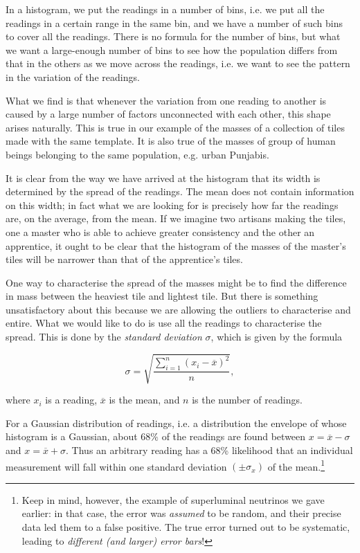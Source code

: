 In a histogram, we put the readings in a number of bins, i.e. we put all the readings in a certain range in the same bin, and we have a number of such bins to cover all the readings. There is no formula for the number of bins, but what we want a large-enough number of bins to see how the population differs from that in the others as we move across the readings, i.e. we want to see the pattern in the variation of the readings. 

What we find is that whenever the variation from one reading to another is caused by a large number of factors unconnected with each other, this shape arises naturally. This is true in our example of the masses of a collection of tiles made with the same template. It is also true of the masses of group of human beings belonging to the same population, e.g. urban Punjabis. 

It is clear from the way we have arrived at the histogram that its width is determined by the spread of the readings. The mean does not contain information on this width; in fact what we are looking for is precisely how far the readings are, on the average, from the mean. If we imagine two artisans making the tiles, one a master who is able to achieve greater consistency and the other an apprentice, it ought to be clear that the histogram of the masses of the master's tiles will be narrower than that of the apprentice's tiles.

One way to characterise the spread of the masses might be to find the difference in mass between the heaviest tile and lightest tile. But there is something unsatisfactory about this because we are allowing the outliers to characterise and entire. What we would like to do is use all the readings to characterise the spread. This is done by the \textit{standard deviation} $\sigma$, which is given by the formula

\begin{equation}
    \sigma = \sqrt{\frac{\sum_{i=1}^{n} (x_i - \overline{x})^2}{n}},
\end{equation}

where $x_i$ is a reading, $\overline{x}$ is the mean, and $n$ is the number of readings.

For a Gaussian distribution of readings, i.e. a distribution the envelope of whose histogram is a Gaussian, about $68 \%$ of the readings are found between $x = \overline{x} - \sigma$ and $x = \overline{x} + \sigma$. Thus an arbitrary reading has a 68\% likelihood that an individual measurement will fall within one standard deviation $(\pm\sigma_x)$ of the mean.\footnote{Keep in mind, however, the example of superluminal neutrinos we gave earlier: in that case, the error was \textit{assumed} to be random, and their precise data led them to a false positive. The true error turned out to be systematic, leading to \textit{different (and larger) error bars}!}


